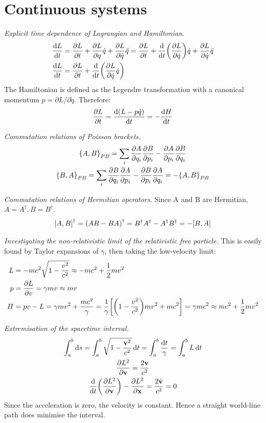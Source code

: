 \documentclass{report}
\begin{document}
\chapter{Continuous systems}

\begin{subquests}
	\item \emph{Explicit time dependence of Lagrangian and Hamiltonian.}
	\begin{align*}
		\dv{L}{t} & = \pdv{L}{t} + \pdv{L}{q}\dot{q} + \pdv{L}{\dot{q}}\ddot{q} = \pdv{L}{t} + \dv{t}\pqty{\pdv{L}{\dot{q}}}\dot{q} + \pdv{L}{\dot{q}}\ddot{q} \\
		\dv{L}{t} & = \pdv{L}{t} + \dv{t}\pqty{\pdv{L}{\dot{q}}\dot{q}}
	\end{align*}
	The Hamiltonian is defined as the Legendre transformation with a canonical momentum $p = \partial{L}/\partial{\dot q}$. Therefore: 
	\begin{gather*}
		\pdv{L}{t} = \dv{\pqty{L - p\dot{q}}}{t} = -\dv{H}{t}  
	\end{gather*}
	\item \emph{Commutation relations of Poisson brackets.}
	\begin{gather*}
		\qty{A,B}_{PB} = \sum_i \pdv{A}{q_i}\pdv{B}{p_i} - \pdv{A}{p_i}\pdv{B}{q_i} \\
		\qty{B,A}_{PB} = \sum_i \pdv{B}{q_i}\pdv{A}{p_i} - \pdv{B}{p_i}\pdv{A}{q_i} = -\qty{A,B}_{PB}
	\end{gather*}
	\item \emph{Commutation relations of Hermitian operators.} Since A and B are Hermitian, $A = A^{\dagger}, B = B^{\dagger}$.
	\begin{gather*}
		\bqty{A,B}^{\dagger} = \pqty{AB - BA}^{\dagger} = B^{\dagger}A^{\dagger} - A^{\dagger}B^{\dagger} = -\bqty{B,A}
	\end{gather*}
	\item \emph{Investigating the non-relativistic limit of the relativistic free particle.} This is easily found by Taylor expansions of $\gamma$, then taking the low-velocity limit:
	\begin{align*}
		L & = -mc^2 \sqrt{1 - \frac{v^2}{c^2}} \approx -mc^2 + \frac{1}{2}mv^2 \\
		p & = \pdv{L}{v} = \gamma mv \approx mv \\
		H & = pv - L = \gamma mv^2 + \frac{mc^2}{\gamma} = \frac{1}{\gamma}\bqty{\pqty{1 - \frac{v^2}{c^2}}mv^2 + mc^2} = \gamma mc^2 \approx mc^2 + \frac{1}{2}mv^2	
	\end{align*}
	\item \emph{Extremisation of the spacetime interval.}
	\begin{gather*}
		\int_a^b \dd{s} = \int_a^b \sqrt{1-\frac{{\vb v}^2}{c^2}} \dd{t} = \int_a^b \frac{\dd{t}}{\gamma} = \int_a^b L \dd{t} \\
		\pdv{L^2}{\vb v} = \frac{2\vb v}{c^2} \\
		\dv{t}\pqty{\pdv{L^2}{\vb v}} - \pdv{L^2}{\vb x} = \frac{2\dot{\vb v}}{c^2} = 0
	\end{gather*}
	Since the acceleration is zero, the velocity is constant. Hence a straight world-line path does minimise the interval.


\end{subquests}
\end{document}
